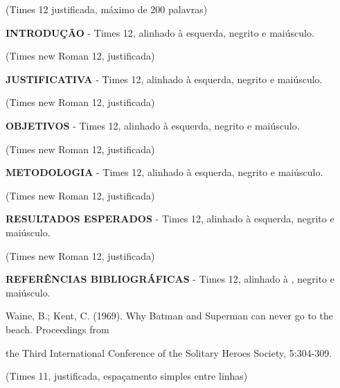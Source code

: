 \documentclass[a4paper,10pt]{article}
\begin{document}
  (Times 12 justificada, máximo de 200 palavras)

  \vspace{1ex}
  \noindent
  \textbf{INTRODUÇÃO} - Times 12, alinhado à esquerda, negrito e maiúsculo.

  (Times new Roman 12, justificada)

  \vspace{1ex}
  \noindent
  \textbf{JUSTIFICATIVA} - Times 12, alinhado à esquerda, negrito e maiúsculo.

  (Times new Roman 12, justificada)

  \noindent
  \textbf{OBJETIVOS} - Times 12, alinhado à esquerda, negrito e maiúsculo.

  (Times new Roman 12, justificada)

  \vspace{1ex}
  \noindent
  \textbf{METODOLOGIA} - Times 12, alinhado à esquerda, negrito e maiúsculo.

  (Times new Roman 12, justificada)

  \vspace{1ex}
  \noindent
  \textbf{RESULTADOS ESPERADOS} - Times 12, alinhado à esquerda, negrito e maiúsculo.

  (Times new Roman 12, justificada)

  \vspace{1ex}
  \noindent
  \textbf{REFERÊNCIAS BIBLIOGRÁFICAS} - Times 12, alinhado à , negrito e maiúsculo.

  \vspace{1ex}
  \noindent
  Waine, B.; Kent, C. (1969). Why Batman and Superman can never go to the beach. Proceedings from

  the Third International Conference of the Solitary Heroes Society, 5:304-309.

  (Times 11, justificada, espaçamento simples entre linhas)


\end{document}
